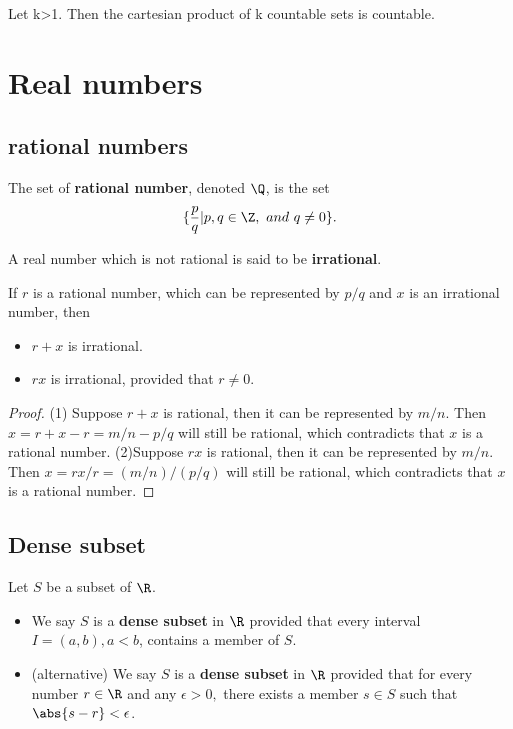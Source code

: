 \begin{refsection}
\begin{corollary}
Let k>1.
Then the cartesian product of k countable sets is countable.
\end{corollary}


\section{Real numbers}

\subsection{rational numbers}
\begin{definition}\cite[21]{johnsonbaugh2010foundations} The set of \textbf{rational number}, denoted $\Q$, is the set 
	$$\{\frac{p}{q}|p,q\in \Z, ~and~ q\neq 0 \}.$$

A real number which is not rational is said to be \textbf{irrational}.
\end{definition}


\begin{lemma} If $r$ is a rational number, which can be represented by $p/q$ and $x$ is an irrational number, then
\begin{itemize}
	\item $r+x$ is irrational.
	\item $rx$ is irrational, provided that $r\neq 0$.
\end{itemize}	
\end{lemma}
\begin{proof}
(1) Suppose $r+x$ is rational, then it can be represented by $m/n$. Then $x = r+x - r = m/n - p/q$ will still be rational, which contradicts that $x$ is a rational number.
(2)Suppose $rx$ is rational, then it can be represented by $m/n$. Then $x = rx/r= (m/n) /(p/q)$ will still be rational, which contradicts that $x$ is a rational number.
\end{proof}

\subsection{Dense subset}\cite[15]{fitzpatrick2006advanced}
\begin{definition}\label{ch:sets：def:denseSubsetInRealNumbers}
Let $S$ be a subset of $\R$.
\begin{itemize}
	\item We say $S$ is a \textbf{dense subset} in $\R$ provided that every interval $I=(a,b), a < b$, contains a member of $S$.
	\item (alternative) We say $S$ is a \textbf{dense subset} in $\R$ provided that for every number $r\in \R$ and any $\epsilon > 0,$ there exists a member  $s\in S$ such that $\abs{s-r}<\epsilon$.
\end{itemize}	
\end{definition}


\end{refsection}

